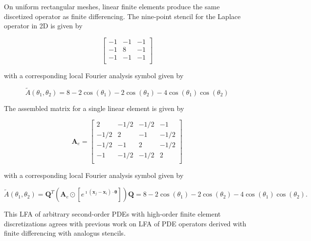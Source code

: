 \documentclass[review]{siamart190516}
\begin{document}
On uniform rectangular meshes, linear finite elements produce the same discetized operator as finite differencing.
The nine-point stencil for the Laplace operator in 2D is given by

\begin{equation}
\begin{bmatrix}
-1  &  -1  &  -1   \\
-1  &   8  &  -1   \\
-1  &  -1  &  -1  \\
\end{bmatrix}
\end{equation}

with a corresponding local Fourier analysis symbol given by

\begin{equation}
\tilde{A} \left( \theta_1, \theta_2 \right) = 8 - 2 \cos \left( \theta_1 \right) - 2 \cos \left( \theta_2 \right) - 4 \cos \left( \theta_1 \right) \cos \left( \theta_2 \right)
\end{equation}

The assembled matrix for a single linear element is given by

\begin{equation}
\mathbf{A}_e =
\begin{bmatrix}
 2    &  -1/2  &  -1/2  &  -1    \\
-1/2  &   2    &  -1    &  -1/2  \\
-1/2  &  -1    &   2    &  -1/2  \\
-1    &  -1/2  &  -1/2  &   2    \\
\end{bmatrix}
\end{equation}

with a corresponding local Fourier analysis symbol given by

\begin{equation}
\tilde{A} \left( \theta_1, \theta_2 \right) = \mathbf{Q}^T \left( \mathbf{A}_e \odot \left[ e^{\imath \left( \mathbf{x}_j - \mathbf{x}_i \right) \cdot \boldsymbol{\theta}} \right] \right) \mathbf{Q} = 8 - 2 \cos \left( \theta_1 \right) - 2 \cos \left( \theta_2 \right) - 4 \cos \left( \theta_1 \right) \cos \left( \theta_2 \right).
\end{equation}

This LFA of arbitrary second-order PDEs with high-order finite element discretizations agrees with previous work on LFA of PDE operators derived with finite differencing with analogus stencils.
\end{document}
